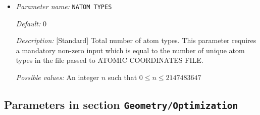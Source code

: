 \begin{itemize}
{\it Default:} 0


{\it Description:} [Standard] Total number of atoms. This parameter requires a mandatory non-zero input which is equal to the number of rows in the file passed to ATOMIC COORDINATES FILE.


{\it Possible values:} An integer $n$ such that $0\leq n \leq 2147483647$
\item {\it Parameter name:} {\tt NATOM TYPES}
\label{parameters:Geometry/NATOM TYPES}
\label{parameters:Geometry/NATOM_20TYPES}




{\it Default:} 0


{\it Description:} [Standard] Total number of atom types. This parameter requires a mandatory non-zero input which is equal to the number of unique atom types in the file passed to ATOMIC COORDINATES FILE.


{\it Possible values:} An integer $n$ such that $0\leq n \leq 2147483647$
\end{itemize}



\subsection{Parameters in section \tt Geometry/Optimization}
\label{parameters:Geometry/Optimization}

